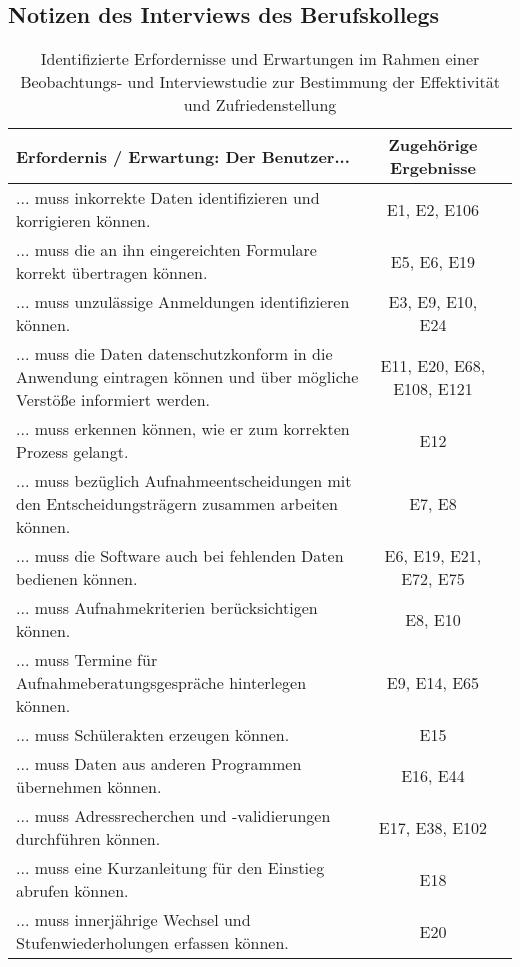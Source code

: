 \subsection{Notizen des Interviews des Berufskollegs}
\label{section-InterviewBerufskolleg}


\begin{landscape}

    \begin{longtable}{p{15cm}cc}
        \caption{Identifizierte Erfordernisse und Erwartungen im Rahmen einer Beobachtungs- und Interviewstudie zur Bestimmung der Effektivität und Zufriedenstellung} \label{tab:mytable} \\
        \toprule
        Erfordernis / Erwartung: Der Benutzer... & Zugehörige Ergebnisse \\
        \midrule
... muss inkorrekte Daten identifizieren und korrigieren können. & E1, E2, E106 \\
... muss die an ihn eingereichten Formulare korrekt übertragen können. & E5, E6, E19 \\
... muss unzulässige Anmeldungen identifizieren können. & E3, E9, E10, E24 \\
... muss die Daten datenschutzkonform in die Anwendung eintragen können und über mögliche Verstöße informiert werden. & E11, E20, E68, E108, E121 \\
... muss erkennen können, wie er zum korrekten Prozess gelangt. & E12 \\
... muss bezüglich Aufnahmeentscheidungen mit den Entscheidungsträgern zusammen arbeiten können. & E7, E8 \\
... muss die Software auch bei fehlenden Daten bedienen können. & E6, E19, E21, E72, E75 \\
... muss Aufnahmekriterien berücksichtigen können. & E8, E10 \\
... muss Termine für Aufnahmeberatungsgespräche hinterlegen können. & E9, E14, E65 \\
... muss Schülerakten erzeugen können. & E15 \\
... muss Daten aus anderen Programmen übernehmen können. & E16, E44 \\
... muss Adressrecherchen und -validierungen durchführen können. & E17, E38, E102 \\
... muss eine Kurzanleitung für den Einstieg abrufen können. & E18 \\
... muss innerjährige Wechsel und Stufenwiederholungen erfassen können. & E20 \\

\end{longtable}
\end{landscape}
